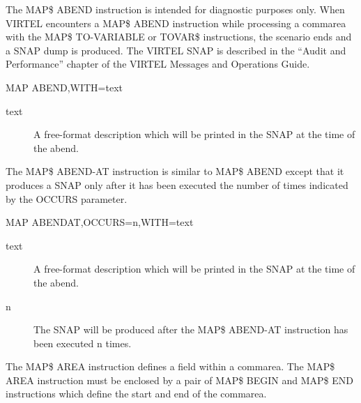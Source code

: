 \documentclass[letterpaper,10pt,english]{sphinxmanual}
\begin{document}

The MAP\$ ABEND instruction is intended for diagnostic purposes only. When VIRTEL encounters a MAP\$ ABEND
instruction while processing a commarea with the MAP\$ TO-VARIABLE or TOVAR\$ instructions, the scenario ends and a
SNAP dump is produced. The VIRTEL SNAP is described in the “Audit and Performance” chapter of the VIRTEL
Messages and Operations Guide.

\begin{sphinxVerbatim}[commandchars=\\\{\}]
MAP\PYGZdl{} ABEND,WITH=\PYGZsq{}text\PYGZsq{}
\end{sphinxVerbatim}
\begin{description}
\item[{text}] \leavevmode
A free-format description which will be printed in the SNAP at the time of the abend.

\end{description}


The MAP\$ ABEND-AT instruction is similar to MAP\$ ABEND except that it produces a SNAP only after it has been
executed the number of times indicated by the OCCURS parameter.

\begin{sphinxVerbatim}[commandchars=\\\{\}]
MAP\PYGZdl{} ABEND\PYGZhy{}AT,OCCURS=n,WITH=\PYGZsq{}text\PYGZsq{}
\end{sphinxVerbatim}
\begin{description}
\item[{text}] \leavevmode
A free-format description which will be printed in the SNAP at the time of the abend.

\item[{n}] \leavevmode
The SNAP will be produced after the MAP\$ ABEND-AT instruction has been executed n times.

\end{description}


The MAP\$ AREA instruction defines a field within a commarea. The MAP\$ AREA instruction must be enclosed by a pair
of MAP\$ BEGIN and MAP\$ END instructions which define the start and end of the commarea.
\end{document}
